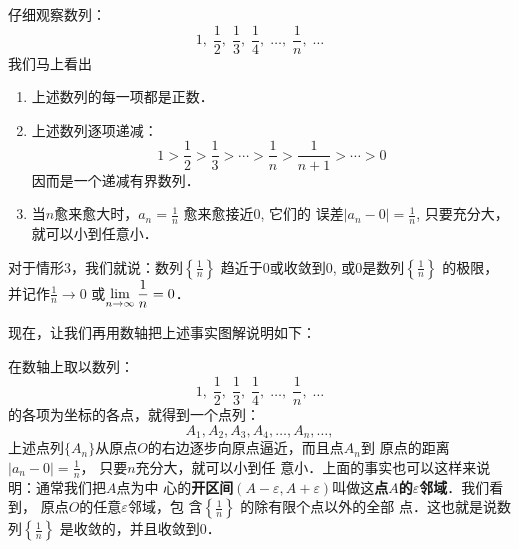 \begin{example}
    仔细观察数列：
    \[1,\; \frac{1}{2},\;\frac{1}{3},\;\frac{1}{4},\; \ldots,\;\frac{1}{n},\;\ldots\]
我们马上看出
\begin{enumerate}
    \item 上述数列的每一项都是正数．
    \item 上述数列逐项递减：
\[1>\frac{1}{2}>\frac{1}{3}>\cdots>\frac{1}{n}>\frac{1}{n+1}>\cdots>0\]
因而是一个递减有界数列．
\item 当$n$愈来愈大时，$a_n=\frac{1}{n}$
愈来愈接近0, 它们的
误差$|a_n-0|=\frac{1}{n}$, 只要充分大，就可以小到任意小．
\end{enumerate}

对于情形3，我们就说：数列$\left\{\frac{1}{n}\right\}$
趋近于0或收敛到0, 或0是数列$\left\{\frac{1}{n}\right\}$
的极限，并记作$\frac{1}{n}\to 0$
或$\displaystyle\lim_{n\to\infty}\dfrac{1}{n}=0$．

现在，让我们再用数轴把上述事实图解说明如下：
\begin{figure}[htp]
    \centering
    \caption{}
\end{figure}

在数轴上取以数列：
\[1,\; \frac{1}{2},\;\frac{1}{3},\;\frac{1}{4},\; \ldots,\;\frac{1}{n},\;\ldots\]
的各项为坐标的各点，就得到一个点列：
\[A_1,A_2,A_3,A_4,\ldots,A_n,\ldots,\]
上述点列$\{A_n\}$从原点$O$的右边逐步向原点逼近，而且点$A_n$到
原点的距离$|a_n-0|=\frac{1}{n}$，
只要$n$充分大，就可以小到任
意小．上面的事实也可以这样来说明：通常我们把$A$点为中
心的\textbf{开区间}$(A-\varepsilon,A+\varepsilon)$叫做这\textbf{点$A$的$\varepsilon$邻域}．我们看到，
原点$O$的任意$\varepsilon$邻域，包
含$\left\{\frac{1}{n}\right\}$
的除有限个点以外的全部
点．这也就是说数列$\left\{\frac{1}{n}\right\}$
是收敛的，并且收敛到0．
\end{example}


